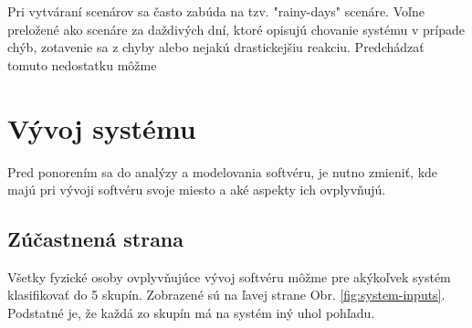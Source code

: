 Pri vytváraní scenárov sa často zabúda na tzv. "rainy-days" scenáre. Voľne preložené ako scenáre za daždivých dní, ktoré opisujú chovanie systému v prípade chýb, zotavenie sa z chyby alebo nejakú drastickejšiu reakciu. Predchádzať tomuto nedostatku môžme 



\section{Vývoj systému}

Pred ponorením sa do analýzy a modelovania softvéru, je nutno zmieniť, kde majú pri vývoji softvéru svoje miesto a aké aspekty ich ovplyvňujú.

\subsection{Zúčastnená strana}

Všetky fyzické osoby ovplyvňujúce vývoj softvéru môžme pre akýkoľvek systém klasifikovať do 5 skupín. Zobrazené sú na ľavej strane Obr. \ref{fig:system-inputs}. Podstatné je, že každá zo skupín má na systém iný uhol pohľadu.

